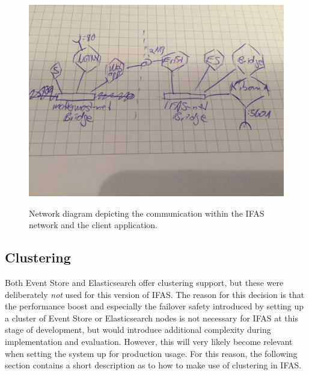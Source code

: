 \begin{figure}[ht]
        \caption{Network diagram depicting the communication within the \ac{IFAS} network and the client application.}
        \includegraphics[width=\textwidth]{gfx/orchestration-network}
        \label{figure:implementation:orchestration:network}
\end{figure}

\subsection{Clustering}

Both Event Store and Elasticsearch offer clustering support, but these were deliberately \emph{not} used for this version of \ac{IFAS}.
The reason for this decision is that the performance boost and especially the failover safety introduced by setting up a cluster of Event Store or Elasticsearch nodes is not necessary for \ac{IFAS} at this stage of development, but would introduce additional complexity during implementation and evaluation.
However, this will very likely become relevant when setting the system up for production usage.
For this reason, the following section contains a short description as to how to make use of clustering in \ac{IFAS}.

